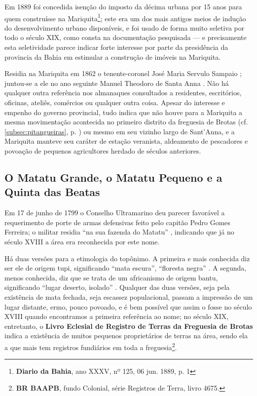 Em 1889 foi concedida isenção do imposto da décima urbana por 15 anos para quem construísse na Mariquita\footnote{\textbf{Diario da Bahia}, ano XXXV, nº 125, 06 jun. 1889, p. 1}; este era um dos mais antigos meios de indução do desenvolvimento urbano disponíveis, e foi usado de forma muito seletiva por todo o século XIX, como consta na documentação pesquisada --- e precisamente esta seletividade parece indicar forte interesse por parte da presidência da provincia da Bahia em estimular a construção de imóveis na Mariquita.

Residia na Mariquita em 1862 o tenente-coronel José Maria Servulo Sampaio \cite[p.~232]{masson_almanak_1862}; juntou-se a ele no ano seguinte Manuel Theodoro de Santa Anna \cite[p.~260]{masson_almanak_1863}. Não há qualquer outra referência nos almanaques consultados a residentes, escritórios, oficinas, ateliês, comércios ou qualquer outra coisa. Apesar do interesse e empenho do governo provincial, tudo indica que não houve para a Mariquita a mesma movimentação acontecida no primeiro distrito da freguesia de Brotas (cf. \autoref{subsec:pitangueiras}, p. \pageref{subsec:pitangueiras}) ou mesmo em seu vizinho largo de Sant'Anna, e a Mariquita manteve seu caráter de estação veranista, aldeamento de pescadores e povoação de pequenos agricultores herdado de séculos anteriores.

\subsection{O Matatu Grande, o Matatu Pequeno e a Quinta das Beatas}\label{subsec:matatubeatas}

Em 17 de junho de 1799 o Conselho Ultramarino deu parecer favorável a requerimento de porte de armas defensivas feito pelo capitão Pedro Gomes Ferreira; o militar residia ``na sua fazenda do Matatu'' \cite[p.~228]{castralmeida_ultramar_1914}, indicando que já no século XVIII a área era reconhecida por este nome. 

Há duas versões para a etimologia do topônimo. A primeira e mais conhecida diz ser ele de origem tupi, significando ``mata escura'', ``floresta negra'' \cite[p.~281]{sampaio_tupi_1987}. A segunda, menos conhecida, diz que se trata de um africanismo de origem bantu, significando ``lugar deserto, isolado'' \cite[p. 46]{dorea_ruas_2006}. Qualquer das duas versões, seja pela existência de mata fechada, seja escassez populacional, passam a impressão de um lugar distante, ermo, pouco povoado, e é bem possível que assim o fosse no século XVIII quando encontramos a primeira referência ao nome; no século XIX, entretanto, o \textbf{Livro Eclesial de Registro de Terras da Freguesia de Brotas} indica a existência de muitos pequenos proprietários de terras na área, sendo ela a que mais tem registros fundiários em toda a freguesia\footnote{\textbf{BR BAAPB}, fundo Colonial, série Registros de Terra, livro 4675.}.


